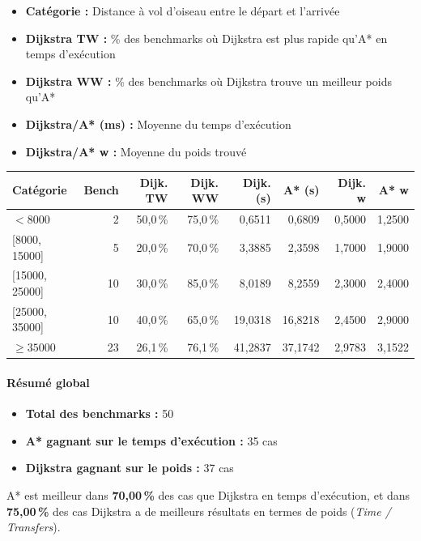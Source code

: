 \documentclass[12pt,a4paper]{article}
\begin{document}
\begin{itemize}
    \item \textbf{Catégorie :} Distance à vol d'oiseau entre le départ et l'arrivée
    \item \textbf{Dijkstra TW :} \% des benchmarks où Dijkstra est plus rapide qu'A* en temps d'exécution
    \item \textbf{Dijkstra WW :} \% des benchmarks où Dijkstra trouve un meilleur poids qu'A*
    \item \textbf{Dijkstra/A* (ms) :} Moyenne du temps d'exécution
    \item \textbf{Dijkstra/A* w :} Moyenne du poids trouvé
\end{itemize}

\begin{center}
\small
\begin{tabular}{lrrrrrrr}
\toprule
\textbf{Catégorie} & \textbf{Bench} & \textbf{Dijk. TW} & \textbf{Dijk. WW} & \textbf{Dijk. (s)} & \textbf{A* (s)} & \textbf{Dijk. w} & \textbf{A* w} \\
\midrule
$< 8000$             &  2 & 50,0\,\% & 75,0\,\% &  0,6511 &  0,6809 & 0,5000 & 1,2500 \\
{[8000, 15000]}      &  5 & 20,0\,\% & 70,0\,\% &  3,3885 &  2,3598 & 1,7000 & 1,9000 \\
{[15000, 25000]}     & 10 & 30,0\,\% & 85,0\,\% &  8,0189 &  8,2559 & 2,3000 & 2,4000 \\
{[25000, 35000]}     & 10 & 40,0\,\% & 65,0\,\% & 19,0318 & 16,8218 & 2,4500 & 2,9000 \\
$\geq 35000$         & 23 & 26,1\,\% & 76,1\,\% & 41,2837 & 37,1742 & 2,9783 & 3,1522 \\
\bottomrule
\end{tabular}
\end{center}

\paragraph{Résumé global}
\begin{itemize}
    \item \textbf{Total des benchmarks :} 50
    \item \textbf{A* gagnant sur le temps d'exécution :} 35 cas
    \item \textbf{Dijkstra gagnant sur le poids :} 37 cas
\end{itemize}

A* est meilleur dans \textbf{70,00\,\%} des cas que Dijkstra en temps d'exécution, et dans \textbf{75,00\,\%} des cas Dijkstra a de meilleurs résultats en termes de poids (\textit{Time / Transfers}).
\end{document}
